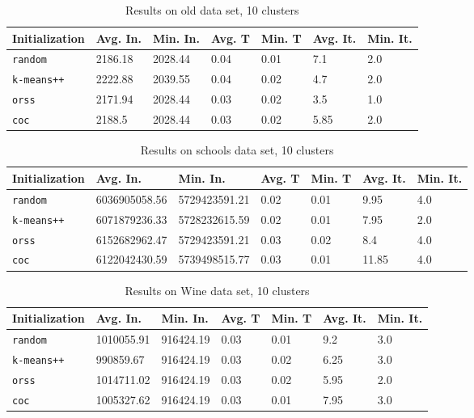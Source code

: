 \begin{table}[h]
	\begin{center}
		\begin{tabular}{|l|l|l|l|l|l|l|}
			\hline
			Initialization & Avg. In. & Min. In. & Avg. T & Min. T & Avg. It. & Min. It.\\\hline
			\texttt{random} & 2186.18 & 2028.44 & 0.04 & 0.01 & 7.1 & 2.0\\\hline
			\texttt{k-means++} & 2222.88 & 2039.55 & 0.04 & 0.02 & 4.7 & 2.0\\\hline
			\texttt{orss} & 2171.94 & 2028.44 & 0.03 & 0.02 & 3.5 & 1.0\\\hline
			\texttt{coc} & 2188.5 & 2028.44 & 0.03 & 0.02 & 5.85 & 2.0\\\hline
		\end{tabular}
		\caption{Results on old data set, 10 clusters}
		\label{tbl:old10}
	\end{center}
\end{table}

\begin{table}[h]
	\begin{center}
		\begin{tabular}{|l|l|l|l|l|l|l|}
			\hline
			Initialization & Avg. In. & Min. In. & Avg. T & Min. T & Avg. It. & Min. It.\\\hline
			\texttt{random} & 6036905058.56 & 5729423591.21 & 0.02 & 0.01 & 9.95 & 4.0\\\hline
			\texttt{k-means++} & 6071879236.33 & 5728232615.59 & 0.02 & 0.01 & 7.95 & 2.0\\\hline
			\texttt{orss} & 6152682962.47 & 5729423591.21 & 0.03 & 0.02 & 8.4 & 4.0\\\hline
			\texttt{coc} & 6122042430.59 & 5739498515.77 & 0.03 & 0.01 & 11.85 & 4.0\\\hline
		\end{tabular}
		\caption{Results on schools data set, 10 clusters}
		\label{tbl:schools10}
	\end{center}
\end{table}

\begin{table}[h]
	\begin{center}
		\begin{tabular}{|l|l|l|l|l|l|l|}
			\hline
			Initialization & Avg. In. & Min. In. & Avg. T & Min. T & Avg. It. & Min. It.\\\hline
			\texttt{random} & 1010055.91 & 916424.19 & 0.03 & 0.01 & 9.2 & 3.0\\\hline
			\texttt{k-means++} & 990859.67 & 916424.19 & 0.03 & 0.02 & 6.25 & 3.0\\\hline
			\texttt{orss} & 1014711.02 & 916424.19 & 0.03 & 0.02 & 5.95 & 2.0\\\hline
			\texttt{coc} & 1005327.62 & 916424.19 & 0.03 & 0.01 & 7.95 & 3.0\\\hline
		\end{tabular}
		\caption{Results on Wine data set, 10 clusters}
		\label{tbl:Wine10}
	\end{center}
\end{table}

